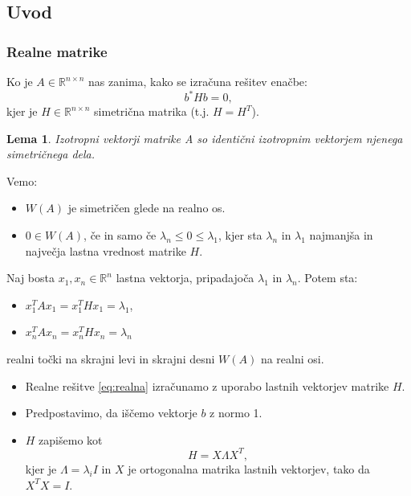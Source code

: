 \documentclass{beamer}
\newcommand{\R}{\mathbb R}
\newtheorem{lema}[izrek]{Lema}
\begin{document}
\subsection{Uvod}
\begin{frame}
\frametitle{Realne matrike}
\begin{block}{}
Ko je $A\in\R^{n\times n}$ nas zanima, kako se izračuna rešitev enačbe:
\begin{equation}\label{eq:realna}
b^\ast Hb=0,
\end{equation}
kjer je $H\in\R^{n\times n}$ simetrična matrika (t.j. $H=H^T$).
\end{block}\pause
\begin{lema} %
Izotropni vektorji matrike A so identični izotropnim vektorjem njenega simetričnega dela.
\end{lema} \pause
Vemo:
\begin{itemize}
\item $W(A)$ je simetričen glede na realno os.
\item $0 \in W(A)$, če in samo če $\lambda_n\le0\le\lambda_1$, kjer sta $\lambda_n$ in $\lambda_1$ najmanjša in največja lastna vrednost matrike $H$.
\end{itemize}
\end{frame}
\begin{frame}
Naj bosta $x_1, x_n \in \R^n$ lastna vektorja, pripadajoča $\lambda_1$ in $\lambda_n$. Potem sta:
\begin{itemize}
\item $x_1^T Ax_1=x_1^T Hx_1=\lambda_1$,
\item $x_n^T Ax_n=x_n^T Hx_n=\lambda_n$
\end{itemize}
realni točki na skrajni levi in skrajni desni $W(A)$ na realni osi.
\begin{itemize}\pause
\item Realne rešitve \eqref{eq:realna} izračunamo z uporabo lastnih vektorjev matrike $H$. 
\item Predpostavimo, da iščemo vektorje $b$ z normo 1.
\item $H$ zapišemo kot $$H=X\Lambda X^T,$$ kjer je $\Lambda=\lambda_i I$ in $X$ je ortogonalna matrika lastnih vektorjev, tako da $X^T X=I$.
\end{itemize}
\end{frame}
\end{document}
